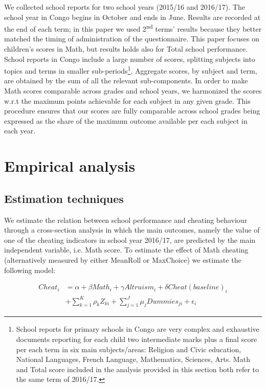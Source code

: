 \documentclass[authoryear, preprint, review, 12pt]{elsarticle}
\begin{document}
We collected school reports for two school years (2015/16 and 2016/17). The school year in Congo begins in October and ends in June.  Results are recorded at the end of each term; in this paper we used 2\textsuperscript{nd} terms' results because they better matched the timing of administration of the questionnaire. This paper focuses on children's scores in Math, but results holds also for Total school performance. School reports in Congo include a large number of scores, splitting subjects into topics and terms in smaller sub-periods\footnote{School reports for primary schools in Congo are very complex and exhaustive documents reporting for each child two intermediate marks plus a final score per each term in six main subjects/areas: Religion and Civic education, National Languages, French Language, Mathematics, Sciences, Arts. Math and Total score included in the analysis provided in this section both refer to the same term of 2016/17.}. Aggregate scores, by subject and term, are obtained by the sum of all the relevant sub-components. In order to make Math scores comparable across grades and school years, we harmonized the scores w.r.t the maximum points achievable for each subject in any given grade. This procedure ensures that our scores are fully comparable across school grades being expressed as the share of the maximum outcome available per each subject in each year.

\section{Empirical analysis}
\label{sec:Empiric}
\subsection{Estimation techniques}
\label{sec:estimation}

We estimate the relation between school performance and cheating behaviour through a cross-section analysis in which the main outcomes, namely the value of one of the cheating indicators in school year 2016/17, are predicted by the main independent variable, i.e. Math score. To estimate the effect of Math cheating (alternatively measured by either MeanRoll or MaxChoice) we estimate the following model:

\begin{equation}
\label{eq:model1}
\begin{split}
    Cheat_{i} &= \alpha + \beta Math_{i} + \gamma Altruism_{i} + \delta Cheat (baseline)_{i} \\ 
                 &+ \sum\limits_{k=1}^K\rho_k Z_{ki} + \sum\limits_{j=1}^J\mu_j Dummies_{ji} + \epsilon_{i}
\end{split}
\end{equation}
 
\end{document}
